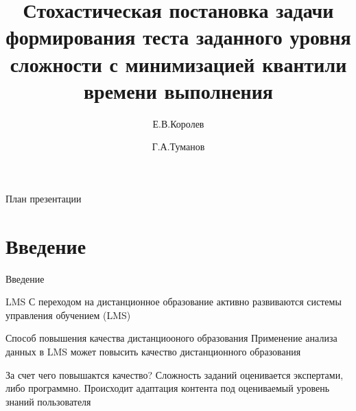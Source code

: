 \documentclass[aspectratio=169]{beamer}
\title[Стохасти- ческая задача формирования теста]{Стохастическая постановка задачи формирования теста заданного уровня сложности с минимизацией квантили времени выполнения}
\author[Королев Егор \and Туманов Георгий]{Е.В.Королев \and Г.А.Туманов}
\institute[НИУ МАИ]{Московский авиационный институт (НИУ)}
\begin{document}
    \begin{frame}
        \maketitle
    \end{frame}

    \begin{frame}{План презентации}
        \tableofcontents
    \end{frame}

    \section{Введение}
    \begin{frame}{Введение}
        \begin{block}{LMS}
            С переходом на дистанционное образование активно развиваются системы управления обучением (LMS)\\
        \end{block}
    
        \begin{block}{Способ повышения качества дистанциооного образования}
            Применение анализа данных в LMS может повысить качество дистанционного образования\\
        \end{block}
    
        \begin{block}{За счет чего повышактся качество?}
            Сложность заданий оценивается экспертами, либо программно. Происходит адаптация контента под оцениваемый уровень знаний пользователя\\
        \end{block}
    \end{frame}
\end{document}
